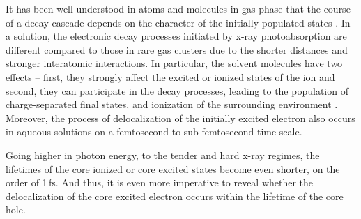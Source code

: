 It has been well understood in atoms and molecules in gas phase that the course of a decay cascade depends on the character of the initially populated states \citep{stoychev08:074307,Demekhin08:043421,Demekhin09:104303,Ouchi11:053415,Miteva14:164303,travnikova16:213001,Gokhberg14:661,Trinter14:664}.
%
%
In a solution, the electronic decay processes initiated by x-ray photoabsorption are different compared to those in rare gas clusters due to the shorter distances and stronger interatomic interactions. In particular, the solvent molecules have two effects -- first, they strongly affect the excited \citep{miteva16:16671} or ionized states of the ion and second, they can participate in the decay processes, leading to the population of charge-separated final states, and ionization of the surrounding environment \citep{Pokapanich09:7264,Pokapanich11:13430,Stumpf16:237,ceolin17:263003,unger17:708}. Moreover, the process of delocalization of the initially excited electron also occurs in aqueous solutions \citep{Nordlund07:217406,Ottosson11:13489} on a femtosecond to sub-femtosecond time scale.

Going higher in photon energy, to the tender and hard x-ray regimes, the lifetimes of the core ionized or core excited states become even shorter, on the order of 1\,fs. And thus, it is even more imperative to reveal whether the delocalization of the core excited electron occurs within the lifetime of the core hole.



